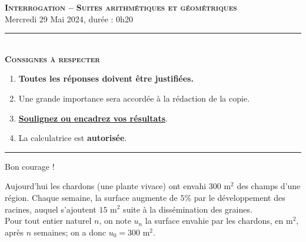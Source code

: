 \documentclass[12pt]{article}
\begin{document}
%
%

\begin{center}
\textbf{\LARGE \textsc{Interrogation -- Suites arithmétiques et
géométriques}}\\[2mm]

{\large Mercredi 29 Mai 2024, durée : 0h20}\\[1mm]
\noindent\rule{8cm}{0.4pt}\\[1mm]
\textbf{\textsc{Consignes à respecter}}
\begin{enumerate}[label=\textbf{\arabic*/}]
\item \textbf{Toutes les réponses doivent être justifiées.}
\item Une grande importance sera accordée à la rédaction de la
  copie.
\item \underline{\textbf{Soulignez ou encadrez vos résultats}}.
\item La calculatrice est \textbf{autorisée}.
\end{enumerate}
\noindent\rule{12cm}{0.4pt}
\end{center}

\begin{center}
  Bon courage !
\end{center}

Aujourd'hui les chardons (une plante vivace) ont envahi $300$ m$^2$ des champs
d'une région. Chaque semaine, la surface augmente de $5\%$ par le développement
des racines, auquel s'ajoutent $15$ m$^2$ suite à la dissémination des
graines.\\[5mm]
Pour tout entier naturel $n$, on note $u_n$ la surface envahie par les chardons,
en m$^2$, après $n$ semaines; on a donc $u_0=300$ m$^2$.\\[5mm]
\end{document}

